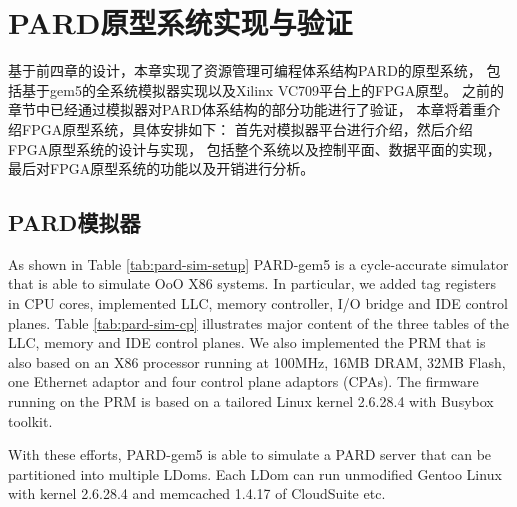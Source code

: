 

\chapter{PARD原型系统实现与验证}
\label{chap:impl}

基于前四章的设计，本章实现了资源管理可编程体系结构PARD的原型系统，
包括基于gem5的全系统模拟器实现以及Xilinx VC709平台上的FPGA原型。
之前的章节中已经通过模拟器对PARD体系结构的部分功能进行了验证，
本章将着重介绍FPGA原型系统，具体安排如下：
首先对模拟器平台进行介绍，然后介绍FPGA原型系统的设计与实现，
包括整个系统以及控制平面、数据平面的实现，
最后对FPGA原型系统的功能以及开销进行分析。

\section{PARD模拟器}
\label{chap:impl:simulator}

As shown in Table \ref{tab:pard-sim-setup}
PARD-gem5 is a cycle-accurate simulator that is able to simulate OoO X86 systems.
In particular, we added tag registers in CPU cores,
implemented LLC, memory controller, I/O bridge and
IDE control planes.
Table \ref{tab:pard-sim-cp} illustrates major
content of the three tables of the LLC, memory and IDE control planes.
We also implemented the PRM that is also based on an X86 processor running
at 100MHz, 16MB DRAM, 32MB Flash, one Ethernet adaptor and four control plane adaptors (CPAs).
The firmware running on the PRM is based on a tailored
Linux kernel 2.6.28.4 with Busybox \cite{busybox} toolkit.

With these efforts, PARD-gem5 is able to simulate a PARD server that can
be partitioned into multiple LDoms. Each LDom can run unmodified Gentoo Linux
with kernel 2.6.28.4 and memcached 1.4.17 \cite{memcached} of CloudSuite \cite{Ferdman:2012:cloudsuite} etc.


